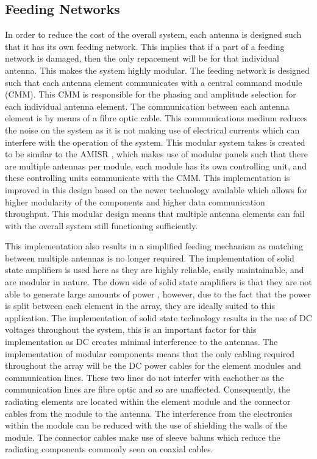 \documentclass[11pt]{witseiepaper}
\begin{document}


\subsection{Feeding Networks} \label{sec:FeedingNetworks}
In order to reduce the cost of the overall system, each antenna is designed such that it has its own feeding network. This implies that if a part of a feeding network is damaged, then the only repacement will be for that individual antenna. This makes the system highly modular. 
The feeding network is designed such that each antenna element communicates with a central command module (CMM). This CMM is responsible for the phasing and amplitude selection for each individual antenna element.
The communication between each antenna element is by means of a fibre optic cable. This communications medium reduces the noise on the system as it is not making use of electrical currents which can interfere with the operation of the system. 
This modular system takes is created to be similar to the AMISR \cite{AMISR}, which makes use of modular panels such that there are multiple antennas per module, each module has its own controlling unit, and these controlling units communicate with the CMM.
This implementation is improved in this design based on the newer technology available which allows for higher modularity of the components and higher data communication throughput.
This modular design means that multiple antenna elements can fail with the overall system still functioning sufficiently.

This implementation also results in a simplified feeding mechanism as matching between multiple antennas is no longer required.
The implementation of solid state amplifiers is used here as they are highly reliable, easily maintainable, and are modular in nature. The down side of solid state amplifiers is that they are not able to generate large amounts of power \cite[p.~364]{radarHandbook}, however, due to the fact that the power is split between each element in the array, they are ideally suited to this application. The implementation of solid state technology results in the use of DC voltages throughout the system, this is an important factor for this implementation as DC creates minimal interference to the antennas.
The implementation of modular components means that the only cabling required throughout the array will be the DC power cables for the element modules and communication lines. These two lines do not interfer with eachother as the communication lines are fibre optic and so are unaffected.
Consequently, the radiating elements are located within the element module and the connector cables from the module to the antenna.
The interference from the electronics within the module can be reduced with the use of shielding the walls of the module. The connector cables make use of sleeve baluns which reduce the radiating components commonly seen on coaxial cables.
\end{document}
